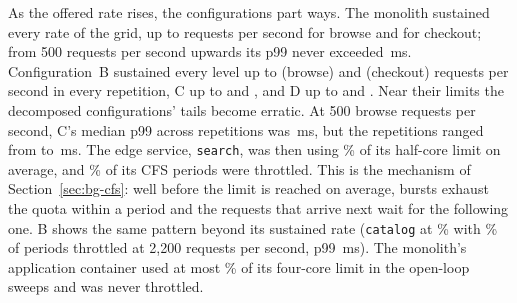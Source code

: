 As the offered rate rises, the configurations part ways. The monolith sustained every rate of the grid, up to
 requests per second for browse and  for checkout; from 500 requests per
second upwards its p99 never exceeded \,ms. Configuration~B sustained every level up to  (browse) and 
(checkout) requests per second in every repetition, C up to  and ,
and D up to  and . Near their limits the decomposed configurations' tails become erratic. At 500
browse requests per second, C's median p99 across repetitions was \,ms, but the repetitions
ranged from  to \,ms. The edge service, \texttt{search}, was then
using \% of its half-core limit on average, and \% of its CFS
periods were throttled. This is the mechanism of Section~\ref{sec:bg-cfs}: well before the limit is reached on
average, bursts exhaust the quota within a period and the requests that arrive next wait for the following one.
B shows the same pattern beyond its sustained rate (\texttt{catalog} at \% with
\% of periods throttled at 2{,}200 requests per second, p99 \,ms).
The monolith's application container used at most \% of its four-core limit in the
open-loop sweeps and was never throttled.
